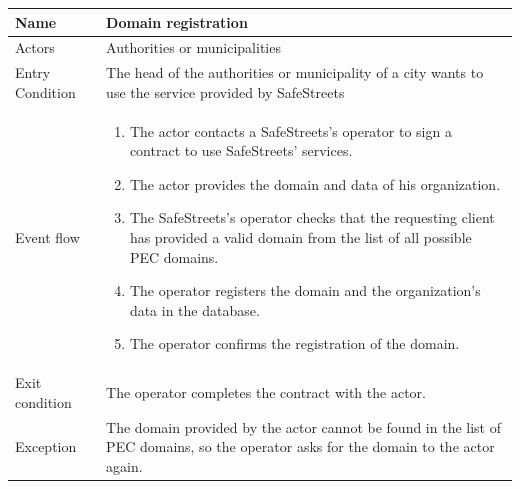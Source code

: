 \vskip 0.2in
\begin{tabular}{|p{3.1cm}|p{11.6cm}|}
\hline
Name & Domain registration\\
\hline
Actors & Authorities or municipalities\\
\hline
Entry Condition & The head of the authorities or municipality of a city wants to use the service provided by SafeStreets\\
\hline
Event flow & \begin{enumerate}
                \item The actor contacts a SafeStreets's operator to sign a contract to use SafeStreets' services.
                \item The actor provides the domain and data of his organization.
                \item The SafeStreets's operator checks that the requesting client has provided a valid domain from the list of all possible PEC domains.
                \item The operator registers the domain and the organization's data in the database.
                \item The operator confirms the registration of the domain.
            \end{enumerate}\\
\hline
Exit condition & The operator completes the contract with the actor.\\
\hline
Exception & The domain provided by the actor cannot be found in the list of PEC domains, so the operator asks for the domain to the actor again.\\
\hline
\end{tabular}

